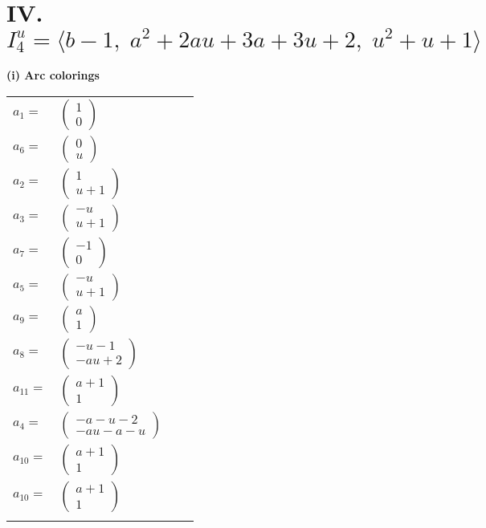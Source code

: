 \documentclass[1p]{elsarticle_modified}
\theoremstyle{definition}
\begin{document}
\centering \section*{IV. $I^u_{4}= \langle b-1,\;a^2+2 a u+3 a+3 u+2,\;u^2+u+1 \rangle$}
\flushleft \textbf{(i) Arc colorings}\\
\begin{tabular}{m{7pt} m{180pt} m{7pt} m{180pt} }
\flushright $a_{1}=$&$\begin{pmatrix}1\\0\end{pmatrix}$ \\
\flushright $a_{6}=$&$\begin{pmatrix}0\\u\end{pmatrix}$ \\
\flushright $a_{2}=$&$\begin{pmatrix}1\\u+1\end{pmatrix}$ \\
\flushright $a_{3}=$&$\begin{pmatrix}- u\\u+1\end{pmatrix}$ \\
\flushright $a_{7}=$&$\begin{pmatrix}-1\\0\end{pmatrix}$ \\
\flushright $a_{5}=$&$\begin{pmatrix}- u\\u+1\end{pmatrix}$ \\
\flushright $a_{9}=$&$\begin{pmatrix}a\\1\end{pmatrix}$ \\
\flushright $a_{8}=$&$\begin{pmatrix}- u-1\\- a u+2\end{pmatrix}$ \\
\flushright $a_{11}=$&$\begin{pmatrix}a+1\\1\end{pmatrix}$ \\
\flushright $a_{4}=$&$\begin{pmatrix}- a- u-2\\- a u- a- u\end{pmatrix}$ \\
\flushright $a_{10}=$&$\begin{pmatrix}a+1\\1\end{pmatrix}$\\ \flushright $a_{10}=$&$\begin{pmatrix}a+1\\1\end{pmatrix}$\\&\end{tabular}
\end{document}
